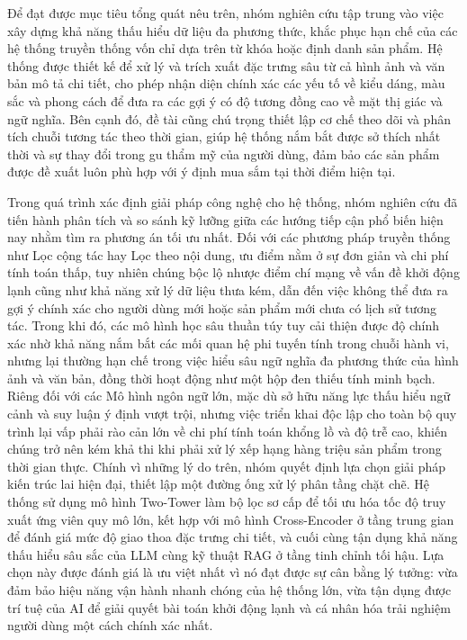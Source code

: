 Để đạt được mục tiêu tổng quát nêu trên, nhóm nghiên cứu tập trung vào việc xây dựng khả năng thấu hiểu dữ liệu đa phương thức, khắc phục hạn chế của các hệ thống truyền thống vốn chỉ dựa trên từ khóa hoặc định danh sản phẩm. Hệ thống được thiết kế để xử lý và trích xuất đặc trưng sâu từ cả hình ảnh và văn bản mô tả chi tiết, cho phép nhận diện chính xác các yếu tố về kiểu dáng, màu sắc và phong cách để đưa ra các gợi ý có độ tương đồng cao về mặt thị giác và ngữ nghĩa. Bên cạnh đó, đề tài cũng chú trọng thiết lập cơ chế theo dõi và phân tích chuỗi tương tác theo thời gian, giúp hệ thống nắm bắt được sở thích nhất thời và sự thay đổi trong gu thẩm mỹ của người dùng, đảm bảo các sản phẩm được đề xuất luôn phù hợp với ý định mua sắm tại thời điểm hiện tại.

Trong quá trình xác định giải pháp công nghệ cho hệ thống, nhóm nghiên cứu đã tiến hành phân tích và so sánh kỹ lưỡng giữa các hướng tiếp cận phổ biến hiện nay nhằm tìm ra phương án tối ưu nhất. Đối với các phương pháp truyền thống như Lọc cộng tác hay Lọc theo nội dung, ưu điểm nằm ở sự đơn giản và chi phí tính toán thấp, tuy nhiên chúng bộc lộ nhược điểm chí mạng về vấn đề khởi động lạnh cũng như khả năng xử lý dữ liệu thưa kém, dẫn đến việc không thể đưa ra gợi ý chính xác cho người dùng mới hoặc sản phẩm mới chưa có lịch sử tương tác. Trong khi đó, các mô hình học sâu thuần túy tuy cải thiện được độ chính xác nhờ khả năng nắm bắt các mối quan hệ phi tuyến tính trong chuỗi hành vi, nhưng lại thường hạn chế trong việc hiểu sâu ngữ nghĩa đa phương thức của hình ảnh và văn bản, đồng thời hoạt động như một hộp đen thiếu tính minh bạch. Riêng đối với các Mô hình ngôn ngữ lớn, mặc dù sở hữu năng lực thấu hiểu ngữ cảnh và suy luận ý định vượt trội, nhưng việc triển khai độc lập cho toàn bộ quy trình lại vấp phải rào cản lớn về chi phí tính toán khổng lồ và độ trễ cao, khiến chúng trở nên kém khả thi khi phải xử lý xếp hạng hàng triệu sản phẩm trong thời gian thực. Chính vì những lý do trên, nhóm quyết định lựa chọn giải pháp kiến trúc lai hiện đại, thiết lập một đường ống xử lý phân tầng chặt chẽ. Hệ thống sử dụng mô hình Two-Tower làm bộ lọc sơ cấp để tối ưu hóa tốc độ truy xuất ứng viên quy mô lớn, kết hợp với mô hình Cross-Encoder ở tầng trung gian để đánh giá mức độ giao thoa đặc trưng chi tiết, và cuối cùng tận dụng khả năng thấu hiểu sâu sắc của LLM cùng kỹ thuật RAG ở tầng tinh chỉnh tối hậu. Lựa chọn này được đánh giá là ưu việt nhất vì nó đạt được sự cân bằng lý tưởng: vừa đảm bảo hiệu năng vận hành nhanh chóng của hệ thống lớn, vừa tận dụng được trí tuệ của AI để giải quyết bài toán khởi động lạnh và cá nhân hóa trải nghiệm người dùng một cách chính xác nhất.

